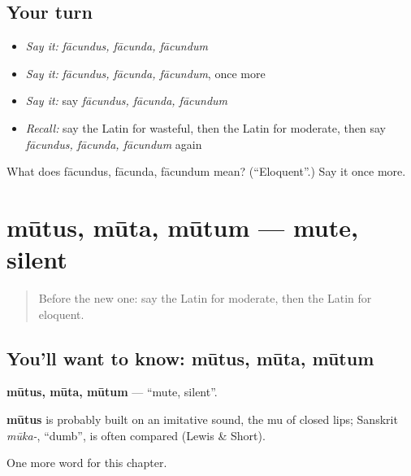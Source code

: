 \subsection*{Your turn}
\begin{itemize}
\raggedright
  \item \emph{Say it:} \emph{fācundus, fācunda, fācundum}
  \item \emph{Say it:} \emph{fācundus, fācunda, fācundum}, once more
  \item \emph{Say it:} say \emph{fācundus, fācunda, fācundum}
  \item \emph{Recall:} say the Latin for wasteful, then the Latin for moderate, then say \emph{fācundus, fācunda, fācundum} again
\end{itemize}

\begin{tcolorbox}[breakable,colback=teal!4,colframe=teal!35!black,title={Before you move on}]
What does fācundus, fācunda, fācundum mean? (\textquotedblleft{}Eloquent\textquotedblright{}.) Say it once more.
\end{tcolorbox}
\section[mūtus, mūta, mūtum]{mūtus, mūta, mūtum — mute, silent}

\label{lesson:LA-C184-mutus}



\begin{quote}
Before the new one: say the Latin for moderate, then the Latin for eloquent.
\end{quote}

\subsection*{You'll want to know: mūtus, mūta, mūtum}
\textbf{mūtus, mūta, mūtum} — \textquotedblleft{}mute, silent\textquotedblright{}.

\begin{cousinweb}
\textbf{mūtus} is probably built on an imitative sound, the mu of closed lips; Sanskrit \emph{mūka-}, \textquotedblleft{}dumb\textquotedblright{}, is often compared (Lewis \& Short).
\end{cousinweb}

\begin{grammarlens}[title={What you've built}]
One more word for this chapter.
\end{grammarlens}

